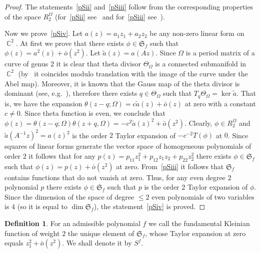 \documentclass{amsart}
\numberwithin{equation}{section}
\theoremstyle{definition}
\newtheorem{definition}[theorem]{Definition}
\theoremstyle{remark}
\DeclareMathOperator{\CC}{\mathbb C}
\begin{document}
\begin{proof}
		The statements~\ref{pSii} and~\ref{pSiii} follow from the corresponding properties of the space $R_2^\Omega$ (for~\ref{pSii} see~\cite[Proposition~II.1.3]{mumfordI} and for~\ref{pSiii} see~\cite[Theorem~II.1.3]{mumfordI}).
		
		Now we prove~\ref{pSiv}. Let $a(z) = a_1z_1 + a_2z_2$ be any non-zero linear form on $\CC^2$. At first we prove that there exists $\phi \in \mathfrak S_f$ such that $\phi(z) = a^2(z) + \bar{o}(z^2)$. Let $\tilde a(z) = a(Az)$. Since $\Omega$ is a period matrix of a curve of genus $2$ it is clear that theta divisor $\Theta_{\Omega}$ is a connected submanifold in $\CC^2$ (by~\cite[Theorem~I.3.1]{mumfordI} it coincides modulo translation with the image of the curve under the Abel map). Moreover, it is known that the Gauss map of the theta divisor is dominant (see, e.g.~\cite[Proposition~4.4.2]{LangeBirkenhake}), therefore there exists $q \in \Theta_\Omega$ such that $T_q\Theta_\Omega = \ker \tilde a$. That is, we have the expansion $\theta(z - q; \Omega) = c\tilde{a}(z) + \bar{o}(z)$ at zero with a constant $c \ne 0$. Since theta function is even, we conclude that $\phi(z) = \theta(z - q;\Omega)\theta(z + q, \Omega) = -c^2\tilde a(z)^2 + \bar{o}(z^2)$. Clearly, $\phi \in R_2^\Omega$ and $\tilde a(A^{-1}z)^2 = a(z)^2$ is the order $2$ Taylor expansion of $-c^{-2}T(\phi)$ at $0$. Since squares of linear forms generate the vector space of homogeneous polynomials of order $2$ it follows that for any $p(z) = p_{11}z_1^2 + p_{12}z_1z_2 + p_{22}z_2^2$ there exists $\phi \in \mathfrak S_f$ such that $\phi(z) = p(z) + \bar{o}(z^2)$ at zero. From~\ref{pSiii} it follows that $\mathfrak S_f$ contains functions that do not vanish at zero. Thus, for any even degree $2$ polynomial $p$ there exists $\phi \in \mathfrak S_f$ such that $p$ is the order $2$ Taylor expansion of $\phi$. Since the dimension of the space of degree $\le2$ even polynomials of two variables is $4$ (so it is equal to $\dim \mathfrak S_f$), the statement~\ref{pSiv} is proved.
	\end{proof}
	\begin{definition}
		For an admissible polynomial $f$ we call the fundamental Kleinian function of weight $2$ the unique element of $\mathfrak S_f$, whose Taylor expansion at zero equals $z_1^2 + \bar{o}(z^2)$. We shall denote it by $S^f$.
	\end{definition}
	
	
\end{document}
